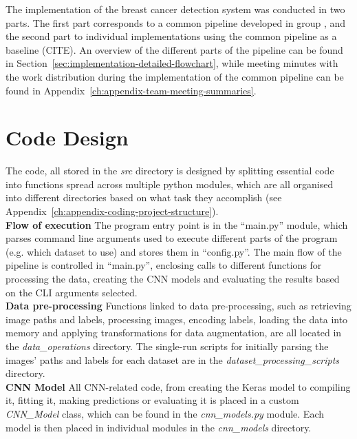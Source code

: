 The implementation of the breast cancer detection system was conducted in two parts. The first part corresponds to a common pipeline developed in group \citep{adam_jaamour_2020_3975093}, and the second part to individual implementations using the common pipeline as a baseline (CITE). An overview of the different parts of the pipeline can be found in Section~\ref{sec:implementation-detailed-flowchart}, while meeting minutes with the work distribution during the implementation of the common pipeline can be found in Appendix~\ref{ch:appendix-team-meeting-summaries}.


\section{Code Design}

The code, all stored in the \textit{src} directory is designed by splitting essential code into functions spread across multiple python modules, which are all organised into different directories based on what task they accomplish (see Appendix~\ref{ch:appendix-coding-project-structure}).\\

\textbf{Flow of execution} \space The program entry point is in the ``main.py'' module, which parses command line arguments used to execute different parts of the program (e.g. which dataset to use) and stores them in ``config.py''. The main flow of the pipeline is controlled in ``main.py'', enclosing calls to different functions for processing the data, creating the CNN models and evaluating the results based on the CLI arguments selected.\\

\textbf{Data pre-processing} \space Functions linked to data pre-processing, such as retrieving image paths and labels, processing images, encoding labels, loading the data into memory and applying transformations for data augmentation, are all located in the \textit{data\_operations} directory. The single-run scripts for initially parsing the images' paths and labels for each dataset are in the \textit{dataset\_processing\_scripts} directory.\\

\textbf{CNN Model} \space All CNN-related code, from creating the Keras model to compiling it, fitting it, making predictions or evaluating it is placed in a custom \textit{CNN\_Model} class, which can be found in the \textit{cnn\_models.py} module. Each model is then placed in individual modules in the \textit{cnn\_models} directory.\\

